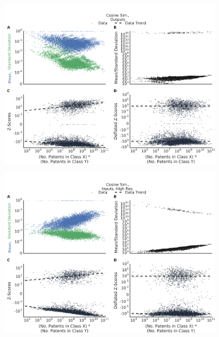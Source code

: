 \documentclass[]{svjour3}
\begin{document}
\begin{figure}[]
\begin{center}
\includegraphics[width=\textwidth]{figs/Z_Score_Inflation_Cosine_Sim_Outputs_IPC.png} 
\end{center}
\caption{}
\end{figure}

\begin{figure}[]
\begin{center}
\includegraphics[width=\textwidth]{figs/Z_Score_Inflation_Cosine_Sim_Inputs_High_Res_IPC.png} 
\end{center}
\caption{}
\end{figure}
\end{document}
